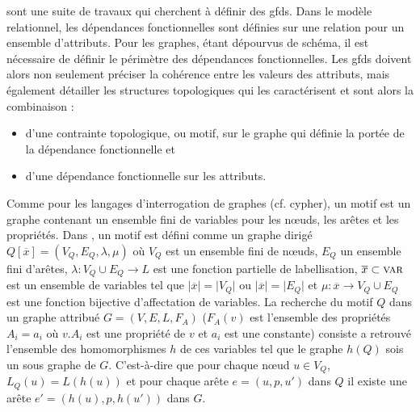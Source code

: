 \cite{fanKeysGraphs2015,fanFunctionalDependenciesGraphs2016, fanDependenciesGraphs2019} sont une suite de travaux qui cherchent à définir des \glspl{gfd}.
Dans le modèle relationnel, les dépendances fonctionnelles sont définies sur une relation pour un ensemble d'attributs.
Pour les graphes, étant dépourvus de schéma, il est nécessaire de définir le périmètre des dépendances fonctionnelles.
Les \glspl{gfd} doivent alors non seulement préciser la cohérence entre les valeurs des attributs, mais également détailler les structures topologiques qui les caractérisent et sont alors la combinaison :
\begin{itemize}
    \item d'une contrainte topologique, ou motif, sur le graphe qui définie la portée de la dépendance fonctionnelle et
    \item d'une dépendance fonctionnelle sur les attributs.
\end{itemize}

Comme pour les langages d'interrogation de graphes (cf. \gls{cypher}), un motif est un graphe contenant un ensemble fini de variables pour les nœuds, les arêtes et les propriétés.
Dans \cite{fanDependenciesGraphs2019}, un motif est défini comme un graphe dirigé $Q[\overline{x}] = (V_Q, E_Q, \lambda, \mu)$ où $V_Q$ est un ensemble fini de nœuds, $E_Q$ un ensemble fini d'arêtes, $\lambda : V_Q \cup E_Q \to L$ est une fonction partielle de labellisation, $\overline{x} \subset \textsc{var}$ est un ensemble de variables tel que $\lvert \overline{x} \rvert = \lvert V_Q \rvert$ ou $\lvert \overline{x} \rvert = \lvert E_Q \rvert$ et $\mu : \overline{x} \to V_Q \cup E_Q$ est une fonction bijective d'affectation de variables.
La recherche du motif $Q$ dans un graphe attribué $G = (V, E, L, F_A)$ ($F_A(v)$ est l'ensemble des propriétés $A_i = a_i$ où $v.A_i$ est une propriété de $v$ et $a_i$ est une constante) consiste a retrouvé l'ensemble des homomorphismes $h$ de ces variables tel que le graphe $h(Q)$ sois un sous graphe de $G$.
C'est-à-dire que pour chaque nœud $u \in V_Q$, $L_Q(u) = L(h(u))$ et pour chaque arête $e = (u, p, u')$ dans $Q$ il existe une arête $e' = (h(u), p, h(u'))$ dans $G$.


